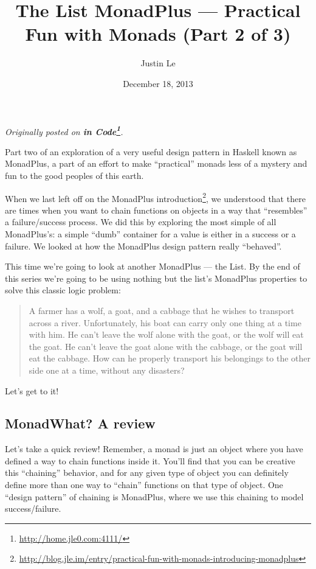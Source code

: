 \documentclass[]{article}
\title{The List MonadPlus --- Practical Fun with Monads (Part 2 of 3)}
\author{Justin Le}
\date{December 18, 2013}
\renewcommand{\href}[2]{#2\footnote{\url{#1}}}
\begin{document}
\maketitle

\emph{Originally posted on \textbf{\href{http://home.jle0.com:4111/}{in
Code}}.}

Part two of an exploration of a very useful design pattern in Haskell
known as MonadPlus, a part of an effort to make ``practical'' monads
less of a mystery and fun to the good peoples of this earth.

When we last left off on the
\href{http://blog.jle.im/entry/practical-fun-with-monads-introducing-monadplus}{MonadPlus
introduction}, we understood that there are times when you want to chain
functions on objects in a way that ``resembles'' a failure/success
process. We did this by exploring the most simple of all MonadPlus's: a
simple ``dumb'' container for a value is either in a success or a
failure. We looked at how the MonadPlus design pattern really
``behaved''.

This time we're going to look at another MonadPlus --- the List. By the
end of this series we're going to be using nothing but the list's
MonadPlus properties to solve this classic logic problem:

\begin{quote}
A farmer has a wolf, a goat, and a cabbage that he wishes to transport
across a river. Unfortunately, his boat can carry only one thing at a
time with him. He can't leave the wolf alone with the goat, or the wolf
will eat the goat. He can't leave the goat alone with the cabbage, or
the goat will eat the cabbage. How can he properly transport his
belongings to the other side one at a time, without any disasters?
\end{quote}

Let's get to it!

\subsection{MonadWhat? A review}\label{monadwhat-a-review}

Let's take a quick review! Remember, a monad is just an object where you
have defined a way to chain functions inside it. You'll find that you
can be creative this ``chaining'' behavior, and for any given type of
object you can definitely define more than one way to ``chain''
functions on that type of object. One ``design pattern'' of chaining is
MonadPlus, where we use this chaining to model success/failure.
\end{document}
